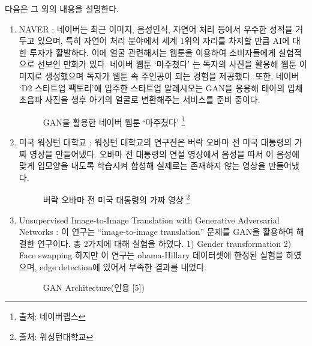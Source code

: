 \documentclass{oblivoir}
\begin{document}
다음은 그 외의 내용을 설명한다.
\begin{enumerate}%

\item NAVER : 네이버는 최근 이미지, 음성인식, 자연어 처리 등에서 우수한 성적을 거두고 있으며, 특히 자연어 처리 분야에서 세계 1위의 자리를 차지할 만큼 AI에 대한 투자가 활발하다. 이에 얼굴 관련해서는 웹툰을 이용하여 소비자들에게 실험적으로 선보인 만화가 있다. 네이버 웹툰 ‘마주쳤다’ 는 독자의 사진을 활용해 웹툰 이미지로 생성했으며 독자가 웹툰 속 주인공이 되는 경험을 제공했다. 또한, 네이버 ‘D2 스타트업 팩토리’에 입주한 스타트업 알레시오는 GAN을 응용해 태아의 입체 초음파 사진을 생후 아기의 얼굴로 변환해주는 서비스를 준비 중이다.

\begin{figure}[h!]
    \centering
    \caption{ GAN을 활용한 네이버 웹툰 ‘마주쳤다’ \protect\footnote{출처: 네이버랩스}}
\end{figure}


\item 미국 워싱턴 대학교 : 워싱턴 대학교의 연구진은 버락 오바마 전 미국 대통령의 가짜 영상을 만들어냈다. 오바마 전 대통령의 연설 영상에서 음성을 따서 이 음성에 맞게 입모양을 내도록 학습시켜 합성해 실제로는 존재하지 않는 영상을 만들어냈다. 

\begin{figure}[h!]
    \centering
    \caption{  버락 오바마 전 미국 대통령의 가짜 영상 \protect\footnote{출처: 워싱턴대학교}}
\end{figure}


\item Unsupervised Image-to-Image Translation with Generative Adversarial Networks : 이 연구는 “image-to-image translation” 문제를 GAN을 활용하여 해결한 연구이다. 총 2가지에 대해 실험을 하였다. 1) Gender transformation 2) Face swapping 하지만 이 연구는 obama-Hillary 데이터셋에 한정된 실험을 하였으며, edge detection에 있어서 부족한 결과를 내었다.

\begin{figure}[h!]
    \centering
    \caption{ GAN Architecture(인용 [5])}
\end{figure}

\end{enumerate}
\end{document}
